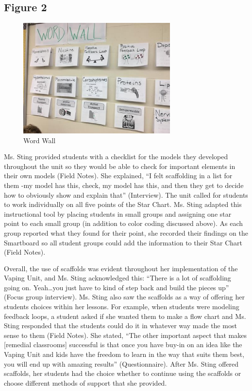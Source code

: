 \documentclass[11.5pt]{sig-alternate}
\begin{document}
\begin{large}
\subsection*{Figure 2}

\begin{figure}[htp]
    \centering
    \includegraphics[width=8cm]{figure2.jpg}
 \caption*{Word Wall}
    \label{Word Wall}
\end{figure}

Ms. Sting provided students with a checklist for the models they developed throughout the unit so they would be able to check for important elements in their own models (Field Notes). She explained, “I felt scaffolding in a list for them -my model has this, check, my model has this, and then they get to decide how to obviously show and explain that” (Interview). The unit called for students to work individually on all five points of the Star Chart. Ms. Sting adapted this instructional tool by placing students in small groups and assigning one star point to each small group (in addition to color coding discussed above). As each group reported what they found for their point, she recorded their findings on the Smartboard so all student groups could add the information to their Star Chart (Field Notes).

Overall, the use of scaffolds was evident throughout her implementation of the Vaping Unit, and Ms. Sting acknowledged this: “There is a lot of scaffolding going on. Yeah…you just have to kind of step back and build the pieces up” (Focus group interview). Ms. Sting also saw the scaffolds as a way of offering her students choices within her lessons. For example, when students were modeling feedback loops, a student asked if she wanted them to make a flow chart and Ms. Sting responded that the students could do it in whatever way made the most sense to them (Field Notes). She stated, “The other important aspect that makes [remedial classrooms] successful is that once you have buy-in on an idea like the Vaping Unit and kids have the freedom to learn in the way that suits them best, you will end up with amazing results” (Questionnaire). After Ms. Sting offered scaffolds, her students had the choice whether to continue using the scaffolds or choose different methods of support that she provided.


\end{large}
\end{document}
